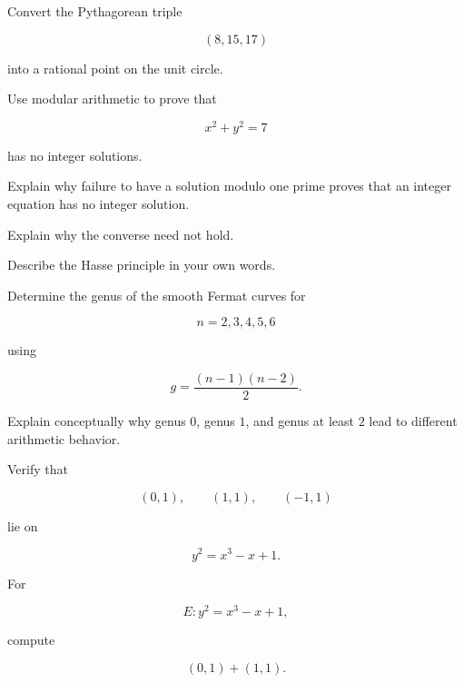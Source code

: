 \begin{exercise}[1]
Convert the Pythagorean triple

\[ (8,15,17) \]

into a rational point on the unit circle.
\end{exercise}

\begin{exercise}[2]
Use modular arithmetic to prove that

\[ x^2+y^2=7 \]

has no integer solutions.
\end{exercise}

\begin{exercise}[2]
Explain why failure to have a solution modulo one prime proves that an
integer equation has no integer solution.
\end{exercise}

\begin{exercise}[2]
Explain why the converse need not hold.
\end{exercise}

\begin{exercise}[2]
Describe the Hasse principle in your own words.
\end{exercise}

\begin{exercise}[1]
Determine the genus of the smooth Fermat curves for

\[ n=2,3,4,5,6 \]

using

\[ g=\frac{(n-1)(n-2)}2. \]
\end{exercise}

\begin{exercise}[2]
Explain conceptually why genus \(0\), genus \(1\), and genus at least \(2\)
lead to different arithmetic behavior.
\end{exercise}

\begin{exercise}[1]
Verify that

\[ (0,1),\qquad(1,1),\qquad(-1,1) \]

lie on

\[ y^2=x^3-x+1. \]
\end{exercise}

\begin{exercise}[2]
For

\[ E:y^2=x^3-x+1, \]

compute

\[ (0,1)+(1,1). \]
\end{exercise}

